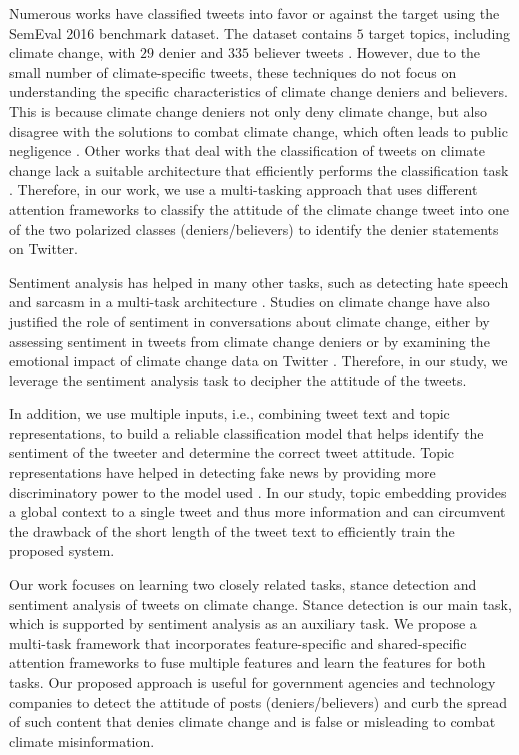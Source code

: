 \documentclass[letterpaper]{article} %
\begin{document}
\par \noindent Numerous works have classified tweets into favor or against the target using the SemEval 2016 benchmark dataset. The dataset contains $5$ target topics, including climate change, with $29$ denier and $335$ believer tweets \cite{li2019multi,wang2020neural}. However, due to the small number of climate-specific tweets, these techniques do not focus on understanding the specific characteristics of climate change deniers and believers. This is because climate change deniers not only deny climate change, but also disagree with the solutions to combat climate change, which often leads to public negligence \cite{zhou2021confirmation}. Other works that deal with the classification of tweets on climate change lack a suitable architecture that efficiently performs the classification task \cite{kabaghe66classifying}. Therefore, in our work, we use a multi-tasking approach that uses different attention frameworks to classify the attitude of the climate change tweet into one of the two polarized classes (deniers/believers) to identify the denier statements on Twitter.
\par \noindent Sentiment analysis has helped in many other tasks, such as detecting hate speech and sarcasm in a multi-task architecture \cite{majumder2019sentiment}. Studies on climate change have also justified the role of sentiment in conversations about climate change, either by assessing sentiment in tweets from climate change deniers or by examining the emotional impact of climate change data on Twitter \cite{dahal2019topic,el2021novel}. Therefore, in our study, we leverage the sentiment analysis task to decipher the attitude of the tweets.
\par \noindent In addition, we use multiple inputs, i.e., combining tweet text and topic representations, to build a reliable classification model that helps identify the sentiment of the tweeter and determine the correct tweet attitude. Topic representations have helped in detecting fake news by providing more discriminatory power to the model used \cite{DBLP:conf/aaai/GautamVM21}. In our study, topic embedding provides a global context to a single tweet and thus more information and can circumvent the drawback of the short length of the tweet text to efficiently train the proposed system.
\par\noindent Our work focuses on learning two closely related tasks, stance detection and sentiment analysis of tweets on climate change. Stance detection is our main task, which is supported by sentiment analysis as an auxiliary task. We propose a multi-task framework that incorporates feature-specific and shared-specific attention frameworks to fuse multiple features and learn the features for both tasks. Our proposed approach is useful for government agencies and technology companies to detect the attitude of posts (deniers/believers) and curb the spread of such content that denies climate change and is false or misleading to combat climate misinformation.
\end{document}
